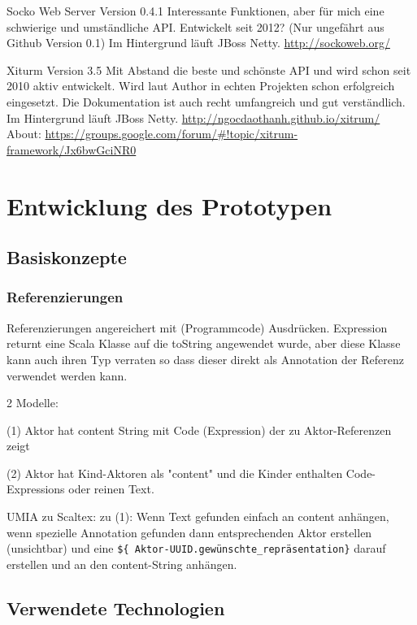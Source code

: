 Socko Web Server Version 0.4.1
Interessante Funktionen, aber für mich eine schwierige und umständliche API.
Entwickelt seit 2012? (Nur ungefährt aus Github Version 0.1)
Im Hintergrund läuft JBoss Netty.
\url{http://sockoweb.org/}

Xiturm Version 3.5
Mit Abstand die beste und schönste API und wird schon seit 2010 aktiv entwickelt.
Wird laut Author in echten Projekten schon erfolgreich eingesetzt.
Die Dokumentation ist auch recht umfangreich und gut verständlich.
Im Hintergrund läuft JBoss Netty.
\url{http://ngocdaothanh.github.io/xitrum/}
About: \url{https://groups.google.com/forum/#!topic/xitrum-framework/Jx6bwGciNR0}



\chapter{Entwicklung des Prototypen}


\section{Basiskonzepte}

\subsection{Referenzierungen}

Referenzierungen angereichert mit (Programmcode) Ausdrücken.
Expression returnt eine Scala Klasse auf die toString angewendet wurde,
aber diese Klasse kann auch ihren Typ verraten so dass dieser direkt
als Annotation der Referenz verwendet werden kann.

2 Modelle:

(1) Aktor hat content String mit Code (Expression) der zu Aktor-Referenzen zeigt

(2) Aktor hat Kind-Aktoren als "content" und die Kinder enthalten Code-Expressions
    oder reinen Text.

UMIA zu Scaltex:
zu (1): Wenn Text gefunden einfach an content anhängen, wenn spezielle
Annotation gefunden dann entsprechenden Aktor erstellen (unsichtbar) und
eine \verb|${ Aktor-UUID.gewünschte_repräsentation}| darauf erstellen und an
den content-String anhängen.


\section{Verwendete Technologien}


